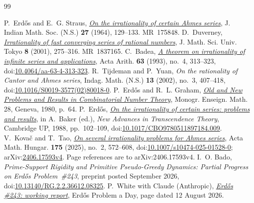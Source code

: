 \documentclass[11pt]{article}
\begin{document}
\begin{thebibliography}{99}
\small
\raggedright
\setlength{\itemsep}{1pt}
 P.~Erd\H{o}s and E.~G. Straus,
  \href{https://users.renyi.hu/~p_erdos/1964-19.pdf}{\emph{On the irrationality
  of certain Ahmes series}},
  J. Indian Math. Soc. (N.S.) \textbf{27} (1964), 129--133. MR~175848.
 D.~Duverney,
  \href{https://www.ms.u-tokyo.ac.jp/journal/pdf/jms080206.pdf}
  {\emph{Irrationality of fast converging series of rational numbers}},
  J. Math. Sci. Univ. Tokyo \textbf{8} (2001), 275--316. MR~1837165.
 C.~Badea,
  \href{https://matwbn.icm.edu.pl/ksiazki/aa/aa63/aa6342.pdf}{\emph{A theorem
  on irrationality of infinite series and applications}}, Acta Arith.
  \textbf{63} (1993), no.~4, 313--323,
  doi:\href{https://doi.org/10.4064/aa-63-4-313-323}{10.4064/aa-63-4-313-323}.
 R.~Tijdeman and P.~Yuan,
  \emph{On the rationality of Cantor and Ahmes series},
  Indag. Math. (N.S.) \textbf{13} (2002), no.~3, 407--418,
  doi:\href{https://doi.org/10.1016/S0019-3577(02)80018-0}{10.1016/S0019-3577(02)80018-0}.
 P.~Erd\H{o}s and R.~L. Graham,
  \href{https://mathweb.ucsd.edu/~ronspubs/80_11_number_theory.pdf}{\emph{Old
  and New Problems and Results in Combinatorial Number Theory}},
  Monogr. Enseign. Math. 28, Geneva, 1980, p.~64.
 P.~Erd\H{o}s,
  \href{https://users.renyi.hu/~p_erdos/1988-22.pdf}{\emph{On the irrationality
  of certain series: problems and results}}, in A.~Baker (ed.), \emph{New
  Advances in Transcendence Theory}, Cambridge UP, 1988, pp.~102--109,
  doi:\href{https://doi.org/10.1017/CBO9780511897184.009}{10.1017/CBO9780511897184.009}.
 V.~Kova\v{c} and T.~Tao,
  \href{https://arxiv.org/abs/2406.17593v4}{\emph{On several irrationality
  problems for Ahmes series}}, Acta Math. Hungar. \textbf{175} (2025), no.~2,
  572--608,
  doi:\href{https://doi.org/10.1007/s10474-025-01528-0}{10.1007/s10474-025-01528-0};
  arXiv:\href{https://arxiv.org/abs/2406.17593v4}{2406.17593v4}.
  Page references are to arXiv:2406.17593v4.
 I.~O. Bado,
  \emph{Prime-Support Rigidity and Primitive Pseudo-Greedy Dynamics:
  Partial Progress on Erd\H{o}s Problem~\#243}, preprint posted September 2026,
  doi:\href{https://doi.org/10.13140/RG.2.2.36612.08325}
  {10.13140/RG.2.2.36612.08325}.
 P.~White with Claude (Anthropic),
  \href{https://erdosproblemaday.com/report/243}{\emph{Erd\H{o}s \#243:
  working report}}, Erd\H{o}s Problem a Day, page dated 12 August 2026.

\end{thebibliography}
\end{document}
